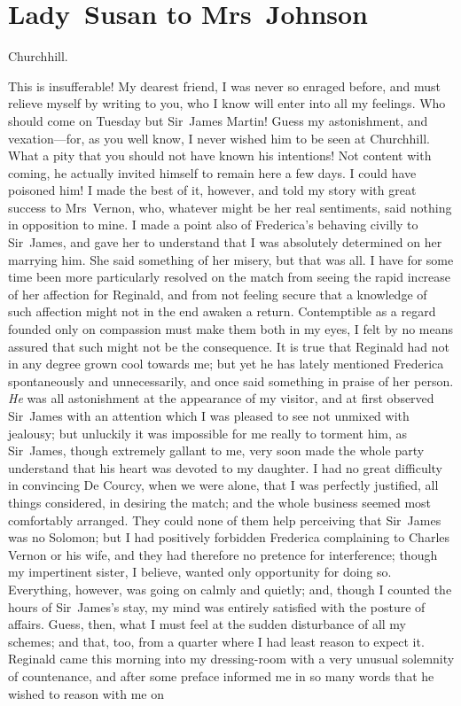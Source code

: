 \chapter{Lady~Susan to Mrs~Johnson}
  
  	\begin{a4}
	\vspace{5em}
	\end{a4}
	
  \begin{mail}{Churchhill.}{}

This is insufferable! My dearest friend, I was never so enraged before, and must relieve myself by writing to you, who I know will enter into all my feelings. Who should come on Tuesday but Sir~James Martin! Guess my astonishment, and vexation—for, as you well know, I never wished him to be seen at Churchhill. What a pity that you should not have known his intentions! Not content with coming, he actually invited himself to remain here a few days. I could have poisoned him! I made the best of it, however, and told my story with great success to Mrs~Vernon, who, whatever might be her real sentiments, said nothing in opposition to mine. I made a point also of Frederica's behaving civilly to Sir~James, and gave her to understand that I was absolutely determined on her marrying him. She said something of her misery, but that was all. I have for some time been more particularly resolved on the match from seeing the rapid increase of her affection for Reginald, and from not feeling secure that a knowledge of such affection might not in the end awaken a return. Contemptible as a regard founded only on compassion must make them both in my eyes, I felt by no means assured that such might not be the consequence. It is true that Reginald had not in any degree grown cool towards me; but yet he has lately mentioned Frederica spontaneously and unnecessarily, and once said something in praise of her person. \textit{He} was all astonishment at the appearance of my visitor, and at first observed Sir~James with an attention which I was pleased to see not unmixed with jealousy; but unluckily it was impossible for me really to torment him, as Sir~James, though extremely gallant to me, very soon made the whole party understand that his heart was devoted to my daughter. I had no great difficulty in convincing De Courcy, when we were alone, that I was perfectly justified, all things considered, in desiring the match; and the whole business seemed most comfortably arranged. They could none of them help perceiving that Sir~James was no Solomon; but I had positively forbidden Frederica complaining to Charles Vernon or his wife, and they had therefore no pretence for interference; though my impertinent sister, I believe, wanted only opportunity for doing so. Everything, however, was going on calmly and quietly; and, though I counted the hours of Sir~James's stay, my mind was entirely satisfied with the posture of affairs. Guess, then, what I must feel at the sudden disturbance of all my schemes; and that, too, from a quarter where I had least reason to expect it. Reginald came this morning into my dressing-room with a very unusual solemnity of countenance, and after some preface informed me in so many words that he wished to reason with me on 
\end{mail}
